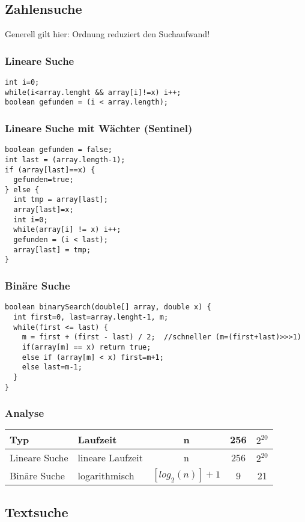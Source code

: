 \documentclass[a4paper,10pt]{article}
\begin{document}
\subsection{Zahlensuche}
Generell gilt hier: Ordnung reduziert den Suchaufwand!

\subsubsection{Lineare Suche}
\begin{lstlisting}
int i=0;
while(i<array.lenght && array[i]!=x) i++;
boolean gefunden = (i < array.length);
\end{lstlisting}

\subsubsection{Lineare Suche mit W\"achter (Sentinel)}
\begin{lstlisting}
boolean gefunden = false;
int last = (array.length-1);
if (array[last]==x) {
  gefunden=true;
} else {
  int tmp = array[last];
  array[last]=x;
  int i=0;
  while(array[i] != x) i++;
  gefunden = (i < last);
  array[last] = tmp;
}
\end{lstlisting}

\subsubsection{Bin\"are Suche}
\begin{lstlisting}
boolean binarySearch(double[] array, double x) {
  int first=0, last=array.lenght-1, m;
  while(first <= last) {
    m = first + (first - last) / 2;  //schneller (m=(first+last)>>>1)
    if(array[m] == x) return true;
    else if (array[m] < x) first=m+1;
    else last=m-1;
  }
}
\end{lstlisting}

\subsubsection{Analyse}
\begin{tabular}{l | l | c | c | c }
	Typ & Laufzeit & n & 256 & $2^{20}$ \\
	\hline
	Lineare Suche & lineare Laufzeit & n & 256 & $2^{20}$ \\
	Bin\"are Suche & logarithmisch & $[log_{2}(n)]+1$ & 9 & 21
\end{tabular}

\subsection{Textsuche}
\end{document}
